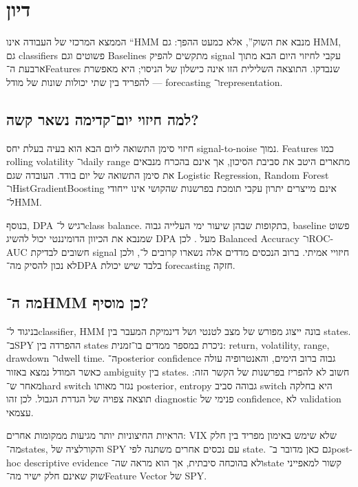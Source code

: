\section{דיון}

הממצא המרכזי של העבודה אינו ``HMM מנבא את השוק'', אלא כמעט ההפך: גם HMM, גם classifiers פשוטים וגם Baselines מתקשים להפיק signal עקבי לחיזוי היום הבא מתוך ארבעת ה־Features שנבדקו. התוצאה השלילית הזו אינה כישלון של הניסוי; היא מאפשרת להפריד בין שתי יכולות שונות של מודל — forecasting ו־representation.

\subsection{למה חיזוי יום־קדימה נשאר קשה?}

חיזוי סימן התשואה ליום הבא הוא בעיה בעלת יחס signal-to-noise נמוך. Features כמו rolling volatility ו־daily range מתארים היטב את סביבת הסיכון, אך אינם בהכרח מנבאים את סימן התשואה של יום בודד. העובדה שגם Logistic Regression, Random Forest ו־HistGradientBoosting אינם מייצרים יתרון עקבי תומכת בפרשנות שהקושי אינו ייחודי ל־HMM.

בנוסף, DPA רגיש ל־class balance. בתקופות שבהן שיעור ימי העלייה גבוה, baseline פשוט שמנבא את הכיוון הדומיננטי יכול להשיג DPA מעל . לכן Balanced Accuracy ו־ROC-AUC חשובים לבדיקת signal חיזויי אמיתי. ברוב הנכסים מדדים אלה נשארו קרובים ל־, ולכן לא נכון להסיק מה־DPA בלבד שיש יכולת forecasting חזקה.

\subsection{מה ה־HMM כן מוסיף?}

בניגוד ל־classifier, HMM בונה ייצוג מפורש של מצב לטנטי ושל דינמיקת המעבר בין states. ב־SPY ההפרדה בין states ניכרת במספר ממדים בו־זמנית: return, volatility, range, drawdown ו־dwell time. ה־posterior confidence גבוה ברוב הימים, והאנטרופיה עולה כאשר המודל נמצא באזור ambiguity בין states. חשוב לא להפריז בפרשנות של הקשר הזה: מאחר ש־hard switch נגזר מאותו posterior, entropy גבוהה סביב switch היא בחלקה תוצאה צפויה של הגדרת הגבול. לכן זהו diagnostic פנימי של confidence, לא validation עצמאי.

הראיות החיצוניות יותר מגיעות ממקומות אחרים: VIX שלא שימש באימון מפריד בין חלק מה־states, והקורלציה של SPY עם נכסים אחרים משתנה לפי state. גם כאן מדובר ב־post-hoc descriptive evidence ולא בהוכחה סיבתית, אך הוא מראה שה־state קשור למאפייני שוק שאינם חלק ישיר מה־Feature Vector של SPY.

